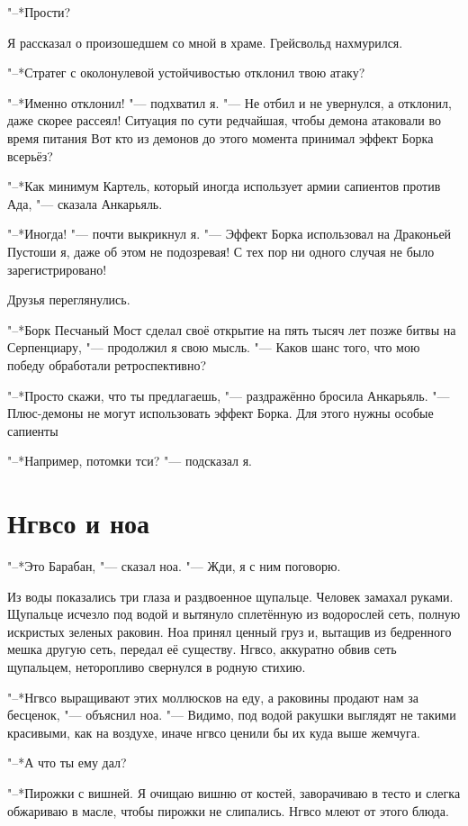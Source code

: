 \documentclass[a4paper,10pt]{book}
\newcommand{\ldotst}{\so{...}\xspace}
\begin{document}
"--*Прости?

Я рассказал о произошедшем со мной в храме. Грейсвольд нахмурился.

"--*Стратег с околонулевой устойчивостью отклонил твою атаку?

"--*Именно отклонил! "--- подхватил я. "--- Не отбил и не увернулся, а 
отклонил, даже скорее рассеял! Ситуация по сути редчайшая, чтобы демона 
атаковали во время питания\ldotst Вот кто из демонов до этого момента принимал 
эффект Борка всерьёз? 

"--*Как минимум Картель, который иногда использует армии сапиентов против Ада, 
"--- сказала Анкарьяль.

"--*Иногда! "--- почти выкрикнул я. "--- Эффект Борка использовал на Драконьей 
Пустоши я, даже об этом не подозревая! С тех пор ни одного случая не было 
зарегистрировано!

Друзья переглянулись.

"--*Борк Песчаный Мост сделал своё открытие на пять тысяч лет позже битвы на 
Серпенциару, "--- продолжил я свою мысль. "--- Каков шанс того, что мою победу 
обработали ретроспективно?

"--*Просто скажи, что ты предлагаешь, "--- раздражённо бросила Анкарьяль. "--- 
Плюс-демоны не могут использовать эффект Борка. Для этого нужны особые 
сапиенты\ldotst

"--*Например, потомки тси? "--- подсказал я.
 
\section{Нгвсо и ноа}
 
"--*Это Барабан, "--- сказал ноа. "--- Жди, я с ним поговорю.

Из воды показались три глаза и раздвоенное щупальце. Человек замахал руками. 
Щупальце исчезло под водой и вытянуло сплетённую из водорослей сеть, полную 
искристых зеленых раковин. Ноа принял ценный груз и, вытащив из бедренного 
мешка другую сеть, передал её существу. Нгвсо, аккуратно обвив сеть щупальцем, 
неторопливо свернулся в родную стихию.

"--*Нгвсо выращивают этих моллюсков на еду, а раковины продают нам за бесценок, 
"--- объяснил ноа. "--- Видимо, под водой ракушки выглядят не такими красивыми, 
как на воздухе, иначе нгвсо ценили бы их куда выше жемчуга.

"--*А что ты ему дал?

"--*Пирожки с вишней. Я очищаю вишню от костей, заворачиваю в тесто и слегка 
обжариваю в масле, чтобы пирожки не слипались. Нгвсо млеют от этого блюда.
\end{document}
